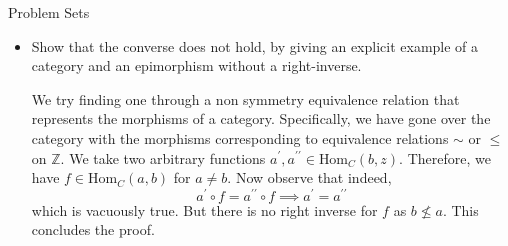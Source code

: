 \documentclass{report}
\begin{document}
\begin{exercises}{Problem Sets}
\begin{itemize}
            \item Show that the converse does not hold, by giving an explicit example of a category and an epimorphism without a right-inverse. 
                \begin{answer}
                    We try finding one through a non symmetry equivalence relation that represents the morphisms of a category. Specifically, we have gone over the category with the morphisms corresponding to equivalence relations $\sim $ or $\leq $ on $\mathbb{Z}$. We take two arbitrary functions $a^{\prime}, a^{\prime\prime} \in \text{Hom}_{C}(b, z)$. Therefore, we have $f \in \text{Hom}_{C}(a, b)$ for $a \neq b$. Now observe that indeed, 
                        \begin{equation*}
                            a^{\prime} \circ f = a^{\prime\prime} \circ f \implies a^{\prime} = a^{\prime\prime}
                        \end{equation*}
                    which is vacuously true. But there is no right inverse for $f$ as $b \not\leq a$. This concludes the proof.
                \end{answer}
        \end{itemize}


\end{exercises}
\end{document}
